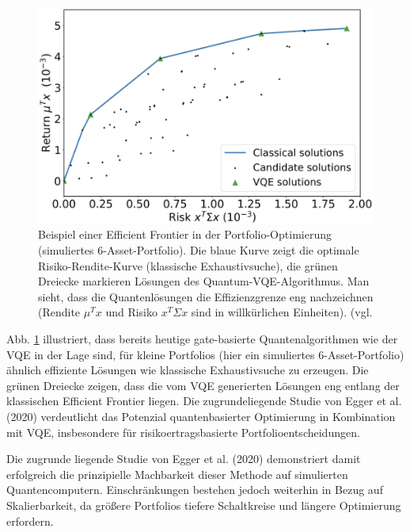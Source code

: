 \begin{figure}
    \centering
    \includegraphics[width=0.8\linewidth]{images/EfficientFrontier_VQE.png}
    \caption{Beispiel einer Efficient Frontier in der Portfolio-Optimierung (simuliertes 6-Asset-Portfolio). Die blaue Kurve zeigt die optimale Risiko-Rendite-Kurve (klassische Exhaustivsuche), die grünen Dreiecke markieren Lösungen des Quantum-VQE-Algorithmus. Man sieht, dass die Quantenlösungen die Effizienzgrenze eng nachzeichnen (Rendite $\mu^T x$ und Risiko $x^T \Sigma x$ sind in willkürlichen Einheiten). (vgl. \cite[Abb. 8]{egger_quantum_2020}}
    \label{fig:efficient_frontier_vqe}
\end{figure}


Abb. \ref{fig:efficient_frontier_vqe} illustriert, dass bereits heutige gate-basierte Quantenalgorithmen wie der VQE in der Lage sind, für kleine Portfolios (hier ein simuliertes 6-Asset-Portfolio) ähnlich effiziente Lösungen wie klassische Exhaustivsuche zu erzeugen. Die grünen Dreiecke zeigen, dass die vom VQE generierten Lösungen eng entlang der klassischen Efficient Frontier liegen. Die zugrundeliegende Studie von Egger et al. (2020) verdeutlicht das Potenzial quantenbasierter Optimierung in Kombination mit VQE, insbesondere für risikoertragsbasierte Portfolioentscheidungen. 

Die zugrunde liegende Studie von Egger et al. (2020) demonstriert damit erfolgreich die prinzipielle Machbarkeit dieser Methode auf simulierten Quantencomputern. Einschränkungen bestehen jedoch weiterhin in Bezug auf Skalierbarkeit, da größere Portfolios tiefere Schaltkreise und längere Optimierung erfordern.
 
